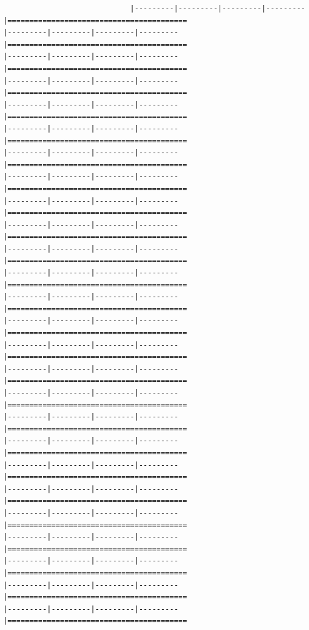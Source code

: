 \documentclass[
]{article}
\begin{document}
\begin{verbatim}
                             |---------|---------|---------|---------|=========================================                                          |---------|---------|---------|---------|=========================================                                          |---------|---------|---------|---------|=========================================                                          |---------|---------|---------|---------|=========================================                                          |---------|---------|---------|---------|=========================================                                          |---------|---------|---------|---------|=========================================                                          |---------|---------|---------|---------|=========================================                                          |---------|---------|---------|---------|=========================================                                          |---------|---------|---------|---------|=========================================                                          |---------|---------|---------|---------|=========================================                                          |---------|---------|---------|---------|=========================================                                          |---------|---------|---------|---------|=========================================                                          |---------|---------|---------|---------|=========================================                                          |---------|---------|---------|---------|=========================================                                          |---------|---------|---------|---------|=========================================                                          |---------|---------|---------|---------|=========================================                                          |---------|---------|---------|---------|=========================================                                          |---------|---------|---------|---------|=========================================                                          |---------|---------|---------|---------|=========================================                                          |---------|---------|---------|---------|=========================================                                          |---------|---------|---------|---------|=========================================                                          |---------|---------|---------|---------|=========================================                                          |---------|---------|---------|---------|=========================================                                          |---------|---------|---------|---------|=========================================                                          |---------|---------|---------|---------|=========================================                                          |---------|---------|---------|---------|=========================================                                          
\end{verbatim}
\end{document}
